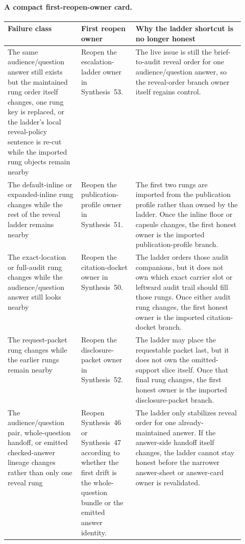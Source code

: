 \documentclass[11pt]{article}
\begin{document}
\paragraph{A compact first-reopen-owner card.}
\begin{table}[t]
\centering
\small
\begin{tabularx}{\linewidth}{@{}p{0.31\linewidth}p{0.23\linewidth}X@{}}
\toprule
Failure class & First reopen owner & Why the ladder shortcut is no longer honest \\
\midrule
The same audience/question answer still exists but the maintained rung order itself changes, one rung key is replaced, or the ladder's local reveal-policy sentence is re-cut while the imported rung objects remain nearby & Reopen the escalation-ladder owner in Synthesis~53. & The live issue is still the brief-to-audit reveal order for one audience/question answer, so the reveal-order branch owner itself regains control. \\
The default-inline or expanded-inline rung changes while the rest of the reveal ladder remains nearby & Reopen the publication-profile owner in Synthesis~51. & The first two rungs are imported from the publication profile rather than owned by the ladder. Once the inline floor or capsule changes, the first honest owner is the imported publication-profile branch. \\
The exact-location or full-audit rung changes while the audience/question answer still looks nearby & Reopen the citation-docket owner in Synthesis~50. & The ladder orders those audit companions, but it does not own which exact carrier slot or leftward audit trail should fill those rungs. Once either audit rung changes, the first honest owner is the imported citation-docket branch. \\
The request-packet rung changes while the earlier rungs remain nearby & Reopen the disclosure-packet owner in Synthesis~52. & The ladder may place the requestable packet last, but it does not own the omitted-support slice itself. Once that final rung changes, the first honest owner is the imported disclosure-packet branch. \\
The audience/question pair, whole-question handoff, or emitted checked-answer lineage changes rather than only one reveal rung & Reopen Synthesis~46 or Synthesis~47 according to whether the first drift is the whole-question bundle or the emitted answer identity. & The ladder only stabilizes reveal order for one already-maintained answer. If the answer-side handoff itself changes, the ladder cannot stay honest before the narrower answer-sheet or answer-card owner is revalidated. \\

\end{tabularx}
\end{table}
\end{document}
